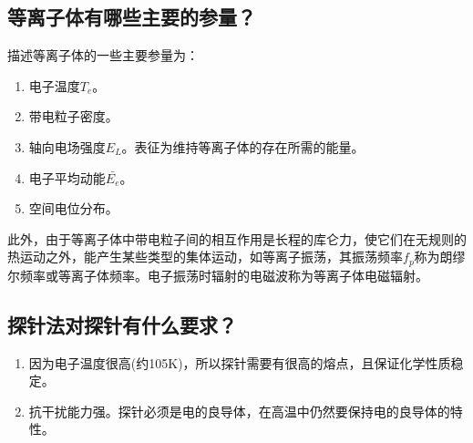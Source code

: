 \documentclass[a4paper]{article}
\begin{document}
\subsection{等离子体有哪些主要的参量？}
描述等离子体的一些主要参量为：
\begin{enumerate}
\item 电子温度$T_e$。
\item 带电粒子密度。
\item 轴向电场强度$E_L$。表征为维持等离子体的存在所需的能量。
\item 电子平均动能$\bar{E_e}$。
\item 空间电位分布。
\end{enumerate}
此外，由于等离子体中带电粒子间的相互作用是长程的库仑力，使它们在无规则的热运动之外，能产生某些类型的集体运动，如等离子振荡，其振荡频率$f_p$称为朗缪尔频率或等离子体频率。电子振荡时辐射的电磁波称为等离子体电磁辐射。
\subsection{探针法对探针有什么要求？}
\begin{enumerate}
\item 因为电子温度很高(约105K)，所以探针需要有很高的熔点，且保证化学性质稳定。
\item 抗干扰能力强。探针必须是电的良导体，在高温中仍然要保持电的良导体的特性。
\end{enumerate}

\nocite{jiaocai}

\end{document}
